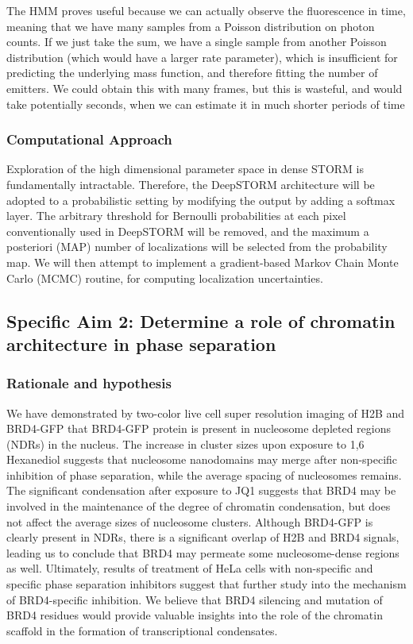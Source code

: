 \documentclass{ucetd}
\begin{document}
The HMM proves useful because we can actually observe the fluorescence in time, meaning that we have many samples from a Poisson distribution on photon counts. If we just take the sum, we have a single sample from another Poisson distribution (which would have a larger rate parameter), which is insufficient for predicting the underlying mass function, and therefore fitting the number of emitters. We could obtain this with many frames, but this is wasteful, and would take potentially seconds, when we can estimate it in much shorter periods of time

\subsubsection{Computational Approach}

Exploration of the high dimensional parameter space in dense STORM is fundamentally intractable. Therefore, the DeepSTORM architecture will be adopted to a probabilistic setting by modifying the output by adding a softmax layer. The arbitrary threshold for Bernoulli probabilities at each pixel conventionally used in DeepSTORM will be removed, and the maximum a posteriori (MAP) number of localizations will be selected from the probability map. We will then attempt to implement a gradient-based Markov Chain Monte Carlo (MCMC) routine, for computing localization uncertainties. 

\subsection{Specific Aim 2: Determine a role of chromatin architecture in phase separation}

\subsubsection{Rationale and hypothesis}

We have demonstrated by two-color live cell super resolution imaging of H2B and BRD4-GFP that BRD4-GFP protein is present in nucleosome depleted regions (NDRs) in the nucleus. The increase in cluster sizes upon exposure to 1,6 Hexanediol suggests that nucleosome nanodomains may merge after non-specific inhibition of phase separation, while the average spacing of nucleosomes remains. The significant condensation after exposure to JQ1 suggests that BRD4 may be involved in the maintenance of the degree of chromatin condensation, but does not affect the average sizes of nucleosome clusters. Although BRD4-GFP is clearly present in NDRs, there is a significant overlap of H2B and BRD4 signals, leading us to conclude that BRD4 may permeate some nucleosome-dense regions as well. Ultimately, results of treatment of HeLa cells with non-specific and specific phase separation inhibitors suggest that further study into the mechanism of BRD4-specific inhibition. We believe that BRD4 silencing and mutation of BRD4 residues would provide valuable insights into the role of the chromatin scaffold in the formation of transcriptional condensates.
\end{document}

